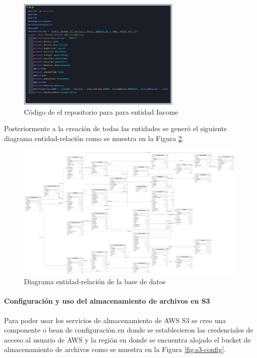 \begin{figure}[H]
    \centering
    \includegraphics[width=0.7\textwidth]{resources/images/entity}
    \caption{Código de el repositorio para para entidad Income}
    \label{fig:repository}
\end{figure}
\newpage

\begin{landscape}
    Posteriormente a la creación de todas las entidades se generó el siguiente diagrama entidad-relación como se muestra en la Figura \ref{fig:er-diagram}.
    \begin{figure}[H]
        \centering
        \includegraphics[width=1.3\textwidth]{resources/images/diagram}
        \caption{Diagrama entidad-relación de la base de datos}
        \label{fig:er-diagram}
    \end{figure}
\end{landscape}
\newpage

\paragraph{Configuración y uso del almacenamiento de archivos en S3}

Para poder usar los servicios de almacenamiento de AWS S3 se creo una componente o bean de configuración en donde se establecieron las credenciales de acceso al usuario de AWS y la región en donde se encuentra alojado el bucket de almacenamiento de archivos como se muestra en la Figura \ref{fig:s3-config}.

